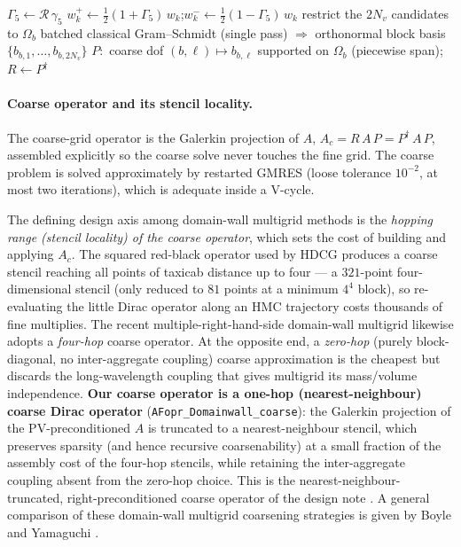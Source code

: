 \documentclass[12pt,a4paper]{article}
\newcommand{\Aop}{A}
\newcommand{\dg}{^{\dagger}}
\begin{document}
\begin{algorithm}[H]
\caption{\textsc{BuildTransfer}: chirality split and block orthonormalisation
$\Rightarrow P,R$.}
\label{alg:transfer}
\begin{algorithmic}[1]
\State $\Gamma_5 \gets \mathcal{R}\,\gamma_5$ 
 
  \State $w_k^{+}\gets\tfrac12(1+\Gamma_5)\,w_k$;\quad $w_k^{-}\gets\tfrac12(1-\Gamma_5)\,w_k$
\EndFor
{}
  \State restrict the $2N_v$ candidates to $\Omega_b$
  \State batched classical Gram--Schmidt (single pass) $\Rightarrow$ orthonormal block basis $\{b_{b,1},\dots,b_{b,2N_v}\}$
\EndFor
\State $P:$ coarse dof $(b,\ell)\mapsto b_{b,\ell}$ supported on $\Omega_b$ (piecewise span);\quad $R\gets P\dg$
\end{algorithmic}
\end{algorithm}

\paragraph{Coarse operator and its stencil locality.}
The coarse-grid operator is the Galerkin projection of $\Aop$,
$\Aop_{c} = R\,\Aop\,P = P\dg\,\Aop\,P$, assembled explicitly so the coarse solve
never touches the fine grid. The coarse problem is solved approximately by
restarted GMRES (loose tolerance $10^{-2}$, at most two iterations), which is
adequate inside a V-cycle.

The defining design axis among domain-wall multigrid methods is the
\emph{hopping range (stencil locality) of the coarse operator}, which sets the
cost of building and applying $\Aop_c$. The squared red-black operator used by
HDCG produces a coarse stencil reaching all points of taxicab distance up to
four --- a $321$-point four-dimensional stencil (only reduced to $81$ points at a
minimum $4^4$ block), so re-evaluating the little Dirac operator along an HMC
trajectory costs thousands of fine multiplies. The recent multiple-right-hand-side
domain-wall multigrid \cite{BoyleMRHS} likewise adopts a \emph{four-hop} coarse
operator. At the
opposite end, a \emph{zero-hop} (purely block-diagonal, no inter-aggregate
coupling) coarse approximation is the cheapest but discards the long-wavelength
coupling that gives multigrid its mass/volume independence. \textbf{Our coarse
operator is a one-hop (nearest-neighbour) coarse Dirac operator}
(\texttt{AFopr\_Domainwall\_coarse}): the Galerkin projection of the
PV-preconditioned $\Aop$ is truncated to a nearest-neighbour stencil, which
preserves sparsity (and hence recursive coarsenability) at a small fraction of
the assembly cost of the four-hop stencils, while retaining the inter-aggregate
coupling absent from the zero-hop choice. This is the nearest-neighbour-truncated,
right-preconditioned coarse operator of the design note \cite{KCM2024}. A general
comparison of these domain-wall multigrid coarsening strategies is given by Boyle
and Yamaguchi \cite{BoyleYamaguchi}.
\end{document}
